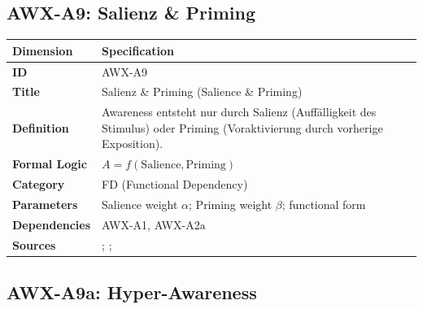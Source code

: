 
\subsection{AWX-A9: Salienz \& Priming}

\begin{table}[htbp]
\small
\begin{tabular}{p{3cm}p{11cm}}
\toprule
\textbf{Dimension} & \textbf{Specification} \\
\midrule
\textbf{ID} & AWX-A9 \\
\textbf{Title} & Salienz \& Priming (Salience \& Priming) \\
\textbf{Definition} & Awareness entsteht nur durch Salienz (Auffälligkeit des Stimulus) oder Priming (Voraktivierung durch vorherige Exposition). \\
\textbf{Formal Logic} & $A = f(\text{Salience}, \text{Priming})$ \\
\textbf{Category} & FD (Functional Dependency) \\
\textbf{Parameters} & Salience weight $\alpha$; Priming weight $\beta$; functional form \\
\textbf{Dependencies} & AWX-A1, AWX-A2a \\
\textbf{Sources} & \citet{bordalo2012salience}; \citet{bordalo2013salience}; \citet{bargh1996automaticity} \\
\bottomrule
\end{tabular}
\end{table}


\subsection{AWX-A9a: Hyper-Awareness}

